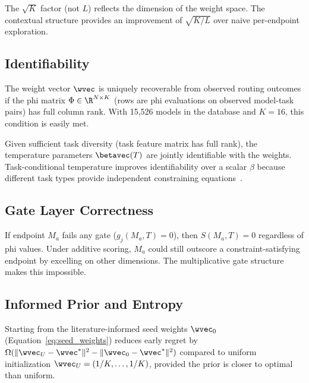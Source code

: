 The $\sqrt{K}$ factor (not $L$) reflects the dimension of the weight space. The contextual structure provides an improvement of $\sqrt{K/L}$ over naive per-endpoint exploration.

\subsection{Identifiability}

\begin{theorem}
\label{thm:weight_id}
The weight vector $\wvec$ is uniquely recoverable from observed routing outcomes if the phi matrix $\Phi \in \R^{N \times K}$ (rows are phi evaluations on observed model-task pairs) has full column rank. With 15,526 models in the database and $K=16$, this condition is easily met.
\end{theorem}

\begin{theorem}
\label{thm:beta_id}
Given sufficient task diversity (task feature matrix has full rank), the temperature parameters $\betavec(T)$ are jointly identifiable with the weights. Task-conditional temperature improves identifiability over a scalar $\beta$ because different task types provide independent constraining equations~\citep{rothenberg1971identification}.
\end{theorem}

\subsection{Gate Layer Correctness}

\begin{proposition}
\label{prop:poe}
If endpoint $M_a$ fails any gate ($g_j(M_a, T) = 0$), then $S(M_a, T) = 0$ regardless of phi values. Under additive scoring, $M_a$ could still outscore a constraint-satisfying endpoint by excelling on other dimensions. The multiplicative gate structure makes this impossible.
\end{proposition}

\subsection{Informed Prior and Entropy}

\begin{proposition}
\label{prop:prior}
Starting from the literature-informed seed weights $\wvec_0$ (Equation~\ref{eq:seed_weights}) reduces early regret by $\Omega(\|\wvec_U - \wvec^*\|^2 - \|\wvec_0 - \wvec^*\|^2)$ compared to uniform initialization $\wvec_U = (1/K, \ldots, 1/K)$, provided the prior is closer to optimal than uniform.
\end{proposition}

